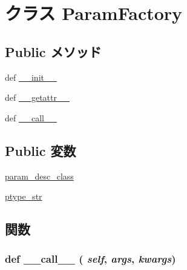 \hypertarget{classm5_1_1params_1_1ParamFactory}{
\section{クラス ParamFactory}
\label{classm5_1_1params_1_1ParamFactory}
}
\subsection*{Public メソッド}
\begin{DoxyCompactItemize}
\item 
def \hyperlink{classm5_1_1params_1_1ParamFactory_ac775ee34451fdfa742b318538164070e}{\_\-\_\-init\_\-\_\-}
\item 
def \hyperlink{classm5_1_1params_1_1ParamFactory_a0a990b3ec3889d40889daca9ee5e4695}{\_\-\_\-getattr\_\-\_\-}
\item 
def \hyperlink{classm5_1_1params_1_1ParamFactory_ae844e0019d38360a86bac1474132db3c}{\_\-\_\-call\_\-\_\-}
\end{DoxyCompactItemize}
\subsection*{Public 変数}
\begin{DoxyCompactItemize}
\item 
\hyperlink{classm5_1_1params_1_1ParamFactory_accac819074ecbc2cb1810e911cbd1713}{param\_\-desc\_\-class}
\item 
\hyperlink{classm5_1_1params_1_1ParamFactory_aa8c35e996fc0b5939673a827d636950d}{ptype\_\-str}
\end{DoxyCompactItemize}


\subsection{関数}
\hypertarget{classm5_1_1params_1_1ParamFactory_ae844e0019d38360a86bac1474132db3c}{
\subsubsection[{\_\-\_\-call\_\-\_\-}]{\setlength{\rightskip}{0pt plus 5cm}def \_\-\_\-call\_\-\_\- ( {\em self}, \/   {\em args}, \/   {\em kwargs})}}
\label{classm5_1_1params_1_1ParamFactory_ae844e0019d38360a86bac1474132db3c}




